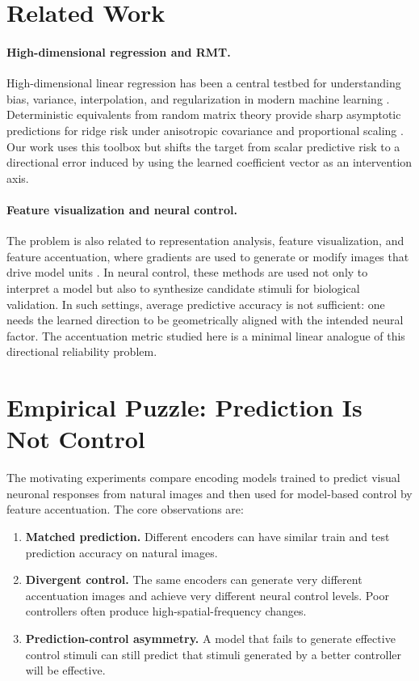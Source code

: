 \documentclass{article}
\begin{document}
\section{Related Work}

\paragraph{High-dimensional regression and RMT.}
High-dimensional linear regression has been a central testbed for understanding bias, variance, interpolation, and regularization in modern machine learning \citep{dobriban2018high,hastie2022surprises,mei2022generalization}. Deterministic equivalents from random matrix theory provide sharp asymptotic predictions for ridge risk under anisotropic covariance and proportional scaling \citep{bai2010spectral,couillet2011random}. Our work uses this toolbox but shifts the target from scalar predictive risk to a directional error induced by using the learned coefficient vector as an intervention axis.

\paragraph{Feature visualization and neural control.}
The problem is also related to representation analysis, feature visualization, and feature accentuation, where gradients are used to generate or modify images that drive model units \citep{olah2017feature,bau2017network,hamblin2024feature}. In neural control, these methods are used not only to interpret a model but also to synthesize candidate stimuli for biological validation. In such settings, average predictive accuracy is not sufficient: one needs the learned direction to be geometrically aligned with the intended neural factor. The accentuation metric studied here is a minimal linear analogue of this directional reliability problem.

\section{Empirical Puzzle: Prediction Is Not Control}

The motivating experiments compare encoding models trained to predict visual neuronal responses from natural images and then used for model-based control by feature accentuation. The core observations are:
\begin{enumerate}
    \item \textbf{Matched prediction.} Different encoders can have similar train and test prediction accuracy on natural images.
    \item \textbf{Divergent control.} The same encoders can generate very different accentuation images and achieve very different neural control levels. Poor controllers often produce high-spatial-frequency changes.
    \item \textbf{Prediction-control asymmetry.} A model that fails to generate effective control stimuli can still predict that stimuli generated by a better controller will be effective.
\end{enumerate}
\end{document}
